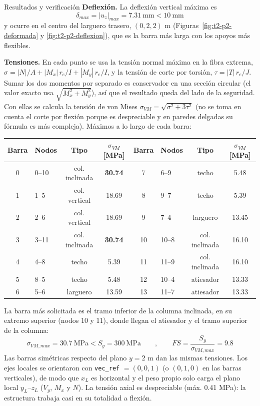 \begin{desarrollo}{Resultados y verificación}
\textbf{Deflexión.} La deflexión vertical máxima es
$$\delta_{max}=|u_z|_{max}=7.31\ \text{mm}<10\ \text{mm}$$
y ocurre en el centro del larguero trasero, $(0,2,2)$ m
(Figuras~\ref{fig:t2-p2-deformada} y \ref{fig:t2-p2-deflexion}), que es la
barra más larga con los apoyos más flexibles.

\textbf{Tensiones.} En cada punto se usa la tensión normal máxima en la
fibra extrema, $\sigma=|N|/A+|M_x|\,r_e/I+|M_y|\,r_e/I$, y la tensión de corte
por torsión, $\tau=|T|\,r_e/J$. Sumar los dos momentos por separado es
conservador en una sección circular (el valor exacto usa
$\sqrt{M_x^2+M_y^2}$), así que el resultado queda del lado de la seguridad.
Con ellas se calcula la tensión de von Mises $\sigma_{VM}=\sqrt{\sigma^2+3\tau^2}$
(no se toma en cuenta el corte por flexión porque es despreciable y en
paredes delgadas su fórmula es más compleja). Máximos a lo largo de cada barra:
\begin{center}
\renewcommand{\arraystretch}{1.15}
\small
\begin{tabular}{clcc@{\hspace{1cm}}clcc}
\hline
Barra & Nodos & Tipo & $\sigma_{VM}$ [MPa] & Barra & Nodos & Tipo & $\sigma_{VM}$ [MPa]\\
\hline
0 & 0--10 & col. inclinada & \textbf{30.74} & 7  & 6--9  & techo      & 5.48\\
1 & 1--5  & col. vertical  & 18.69 & 8  & 9--7  & techo      & 5.39\\
2 & 2--6  & col. vertical  & 18.69 & 9  & 7--4  & larguero   & 13.45\\
3 & 3--11 & col. inclinada & \textbf{30.74} & 10 & 10--8 & col. inclinada & 16.10\\
4 & 4--8  & techo          & 5.39  & 11 & 11--9 & col. inclinada & 16.10\\
5 & 8--5  & techo          & 5.48  & 12 & 10--4 & atiesador  & 13.33\\
6 & 5--6  & larguero       & 13.59 & 13 & 11--7 & atiesador  & 13.33\\
\hline
\end{tabular}
\end{center}
La barra más solicitada es el tramo inferior de la columna inclinada, en su
extremo superior (nodos 10 y 11), donde llegan el atiesador y el tramo
superior de la columna:
$$\sigma_{VM,max}=30.7\ \text{MPa}<S_y=300\ \text{MPa}\qquad,
\qquad FS=\frac{S_y}{\sigma_{VM,max}}=9.8$$
Las barras simétricas respecto del plano $y=2$ m dan las mismas tensiones.
Los ejes locales se orientaron con \texttt{vec\_ref} $=(0,0,1)$ (o $(0,1,0)$ en
las barras verticales), de modo que $x_L$ es horizontal y el peso propio
solo carga el plano local $y_L$--$z_L$ ($V_y$, $M_x$ y $N$). La tensión axial es despreciable (máx.
0.41 MPa): la estructura trabaja casi en su totalidad a flexión.



\end{desarrollo}
